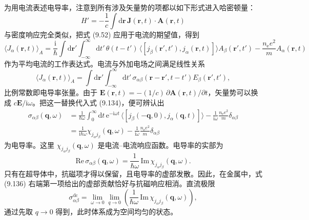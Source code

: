 为用电流表述电导率，注意到所有涉及矢量势的项都以如下形式进入哈密顿量：
\begin{equation*}
H'=-\frac{1}{c}\int\mathrm{d}\mathbf{r}\,\mathbf{J}(\mathbf{r},t)\cdot\mathbf{A}(\mathbf{r},t)
\tag{9.133}
\end{equation*}
与密度响应完全类似，把式 (9.52) 应用于电流的期望值，得到
\begin{equation*}
\langle J_{\alpha}(\mathbf{r},t)\rangle_{A}=\frac{\mathrm{i}}{\hbar}\int\mathrm{d}\mathbf{r}'\int_{-\infty}^{\infty}\mathrm{d}t'\,\theta(t-t')\,\langle[j_{\beta}(\mathbf{r}',t'),j_{\alpha}(\mathbf{r},t)]\rangle A_{\beta}(\mathbf{r}',t')-\frac{n_{\mathrm{e}}e^{2}}{m}A_{\alpha}(\mathbf{r},t)
\tag{9.134}
\end{equation*}
作为平均电流的工作表达式。电流与外加电场之间满足线性关系
\begin{equation*}
\langle J_{\alpha}(\mathbf{r},t)\rangle_{A}=\int\mathrm{d}\mathbf{r}'\int_{-\infty}^{\infty}\mathrm{d}t'\,\sigma_{\alpha\beta}(\mathbf{r}-\mathbf{r}',t-t')E_{\beta}(\mathbf{r}',t'),
\tag{9.135}
\end{equation*}
比例常数即电导率张量。由于 $\mathbf{E}(\mathbf{r},t)=-(1/c)\,\partial\mathbf{A}(\mathbf{r},t)/\partial t$，矢量势可以换成 $c\mathbf{E}/\mathrm{i}\omega$。把这一替换代入式 (9.134)，便可辨认出
\begin{align*}
\sigma_{\alpha\beta}(\mathbf{q},\omega)&=\frac{1}{\hbar\omega}\int_{0}^{\infty}\mathrm{d}t\,\mathrm{e}^{-\mathrm{i}\omega t}\,\langle[j_{\beta}(-\mathbf{q},0),j_{\alpha}(\mathbf{q},t)]\rangle-\frac{1}{\mathrm{i}\omega}\frac{n_{\mathrm{e}}e^{2}}{m}\delta_{\alpha\beta}\\
&=\frac{1}{\mathrm{i}\hbar\omega}\chi_{j_{\alpha}j_{\beta}}(\mathbf{q},\omega)-\frac{1}{\mathrm{i}\omega}\frac{n_{\mathrm{e}}e^{2}}{m}\delta_{\alpha\beta}
\tag{9.136}
\end{align*}
为电导率。这里 $\chi_{j_{\alpha}j_{\beta}}(\mathbf{q},\omega)$ 是电流–电流响应函数。电导率的实部为
\begin{equation*}
\mathrm{Re}\,\sigma_{\alpha\beta}(\mathbf{q},\omega)=\frac{1}{\hbar\omega}\,\mathrm{Im}\,\chi_{j_{\alpha}j_{\beta}}(\mathbf{q},\omega).
\tag{9.137}
\end{equation*}
只有在超导体中，抗磁项才得以保留，且电导率的虚部发散。因此，在金属中，式 (9.136) 右端第一项给出的虚部贡献恰好与抗磁响应相消。直流极限
\begin{equation*}
\sigma_{\alpha\beta}^{\mathrm{dc}}=\lim_{\omega\to0}\lim_{q\to0}\left(\frac{1}{\hbar\omega}\,\mathrm{Im}\,\chi_{j_{\alpha}j_{\beta}}(\mathbf{q},\omega)\right),
\tag{9.138}
\end{equation*}
通过先取 $q\to0$ 得到，此时体系成为空间均匀的状态。

